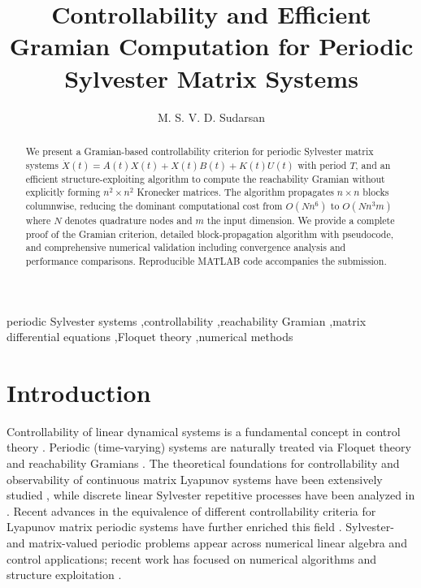 \documentclass[5p,times]{elsarticle} %
\begin{document}
\begin{frontmatter}

\title{Controllability and Efficient Gramian Computation for Periodic Sylvester Matrix Systems}

\author[addr1]{M. S. V. D. Sudarsan}
\address[addr1]{Independent Researcher, MIG-125/F-5, Old H.B. Colony, Bhavanipuram, Vijayawada, Andhra Pradesh, India-520012}

\begin{abstract}
We present a Gramian-based controllability criterion for periodic Sylvester matrix systems $\dot{X}(t) = A(t)X(t) + X(t)B(t) + K(t)U(t)$ with period $T$, and an efficient structure-exploiting algorithm to compute the reachability Gramian without explicitly forming $n^2 \times n^2$ Kronecker matrices. The algorithm propagates $n \times n$ blocks columnwise, reducing the dominant computational cost from $O(Nn^6)$ to $O(Nn^3m)$ where $N$ denotes quadrature nodes and $m$ the input dimension. We provide a complete proof of the Gramian criterion, detailed block-propagation algorithm with pseudocode, and comprehensive numerical validation including convergence analysis and performance comparisons. Reproducible MATLAB code accompanies the submission.
\end{abstract}

\begin{keyword}
periodic Sylvester systems \sep controllability \sep reachability Gramian \sep matrix differential equations \sep Floquet theory \sep numerical methods
\end{keyword}

\end{frontmatter}

\section{Introduction}
Controllability of linear dynamical systems is a fundamental concept in control theory \cite{kalman1963,brockett1970,wonham1985}. Periodic (time-varying) systems are naturally treated via Floquet theory and reachability Gramians \cite{bittanti1984analysis,colaneri1996}. The theoretical foundations for controllability and observability of continuous matrix Lyapunov systems have been extensively studied \cite{murthy1997}, while discrete linear Sylvester repetitive processes have been analyzed in \cite{putcha2014}. Recent advances in the equivalence of different controllability criteria for Lyapunov matrix periodic systems have further enriched this field \cite{sudarsan2025}. Sylvester- and matrix-valued periodic problems appear across numerical linear algebra and control applications; recent work has focused on numerical algorithms and structure exploitation \cite{simoncini2016,hajarian2016,lv2017,duan2002}.
\end{document}
